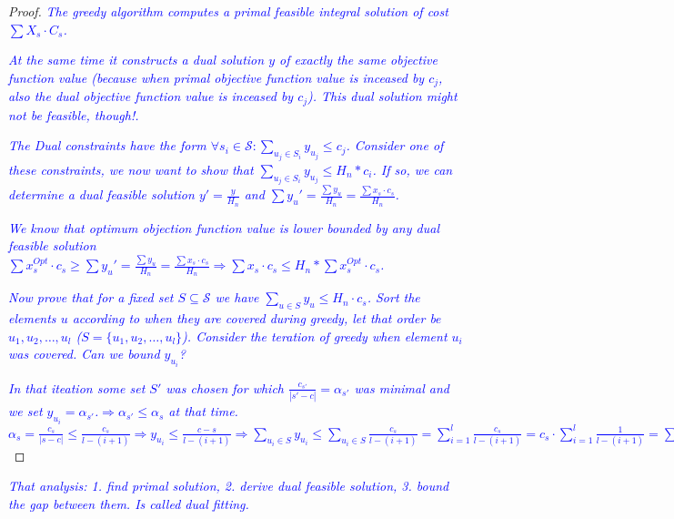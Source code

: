\documentclass{article}
\begin{document}
\begin{proof}
\textcolor{blue}{\emph{The greedy algorithm computes a primal feasible integral solution of cost $\sum{X_s \cdot C_s}$.}}

\textcolor{blue}{\emph{At the same time it constructs a dual solution $y$ of exactly the same objective function value (because when primal objective function value is inceased by $c_j$, also the dual objective function value is inceased by $c_j$). This dual solution might not be feasible, though!.}}

\textcolor{blue}{\emph{The Dual constraints have the form $\forall s_i \in \mathcal{S}: \sum_{u_j \in S_i}{y_{u_j}} \leq c_j$. Consider one of these constraints, we now want to show that $\sum_{u_j \in S_i}{y_{u_j}} \leq H_n*c_i$. If so, we can determine a dual feasible solution $y' =\frac{y}{H_n}$ and $\sum{y_{u}'} = \frac{\sum{y_u}}{H_n} = \frac{\sum{x_s \cdot c_s}}{H_n}$.}}

\textcolor{blue}{\emph{We know that optimum objection function value is lower bounded by any dual feasible solution $\sum{x_{s}^{Opt} \cdot c_s} \geq \sum{y_{u}'} = \frac{\sum{y_u}}{H_n} = \frac{\sum{x_s \cdot c_s}}{H_n} \Rightarrow \sum{x_s \cdot c_s} \leq H_n * \sum{x_{s}^{Opt}} \cdot c_s$.}}

\textcolor{blue}{\emph{Now prove that for a fixed set $S \subseteq \mathcal{S}$ we have $\sum_{u \in S}{y_u} \leq H_n  \cdot c_s$. Sort the elements $u$ according to when they are covered during greedy, let that order be $u_1, u_2, \dots , u_l$ ($S = \{u_1, u_2, \dots , u_l\}$). Consider the teration of greedy when element $u_i$ was covered. Can we bound $y_{u_i}$?}}

\textcolor{blue}{\emph{In that iteation some set $S'$ was chosen for which $\frac{c_{s'}}{|s'-c|} = \alpha_{s'}$ was minimal and we set $y_{u_i} = \alpha_{s'}$.$\Rightarrow \alpha_{s'} \leq \alpha_{s}$ at that time. $\alpha_{s}= \frac{c_s}{|s-c|} \leq \frac{c_s}{l - (i+1)} \Rightarrow y_{u_i} \leq \frac{c-s}{l - (i+1)} \Rightarrow \sum_{u_i \in S}{y_{u_i}} \leq \sum_{u_i \in S}{\frac{c_s}{l - (i+1)}} = \sum_{i=1}^l{\frac{c_s}{l - (i+1)}} = c_s \cdot \sum_{i=1}^l{\frac{1}{l - (i+1)}} = \sum_{i=1}^l{\frac{1}{i}} = c_s \cdot H_l \leq c_s \cdot H_n$}}
\end{proof}

\textcolor{blue}{\emph{That analysis: 1. find primal solution, 2. derive dual feasible solution, 3. bound the gap between them. Is called dual fitting.}}
\end{document}
